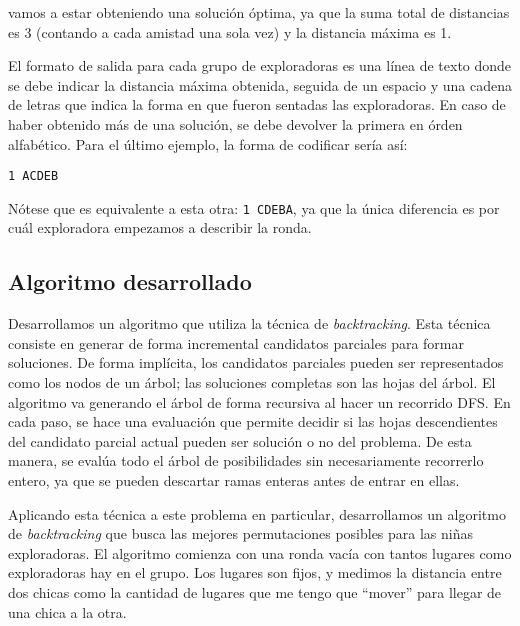 vamos a estar obteniendo una solución óptima, ya que la suma total de distancias es 3 (contando a cada amistad una sola vez) y la distancia máxima es 1.

El formato de salida para cada grupo de exploradoras es una línea de texto donde se debe indicar la distancia máxima obtenida, seguida de un espacio y una cadena de letras que indica la forma en que fueron sentadas las exploradoras. En caso de haber obtenido más de una solución, se debe devolver la primera en órden alfabético. Para el último ejemplo, la forma de codificar sería así:

\texttt{1 ACDEB}

Nótese que es equivalente a esta otra: \texttt{1 CDEBA}, ya que la única diferencia es por cuál exploradora empezamos a describir la ronda.



\subsection{Algoritmo desarrollado}

Desarrollamos un algoritmo que utiliza la técnica de \textit{backtracking}. Esta técnica consiste en generar de forma incremental candidatos parciales para formar soluciones. De forma implícita, los candidatos parciales pueden ser representados como los nodos de un árbol; las soluciones completas son las hojas del árbol. El algoritmo va generando el árbol de forma recursiva al hacer un recorrido DFS. En cada paso, se hace una evaluación que permite decidir si las hojas descendientes del candidato parcial actual pueden ser solución o no del problema. De esta manera, se evalúa todo el árbol de posibilidades sin necesariamente recorrerlo entero, ya que se pueden descartar ramas enteras antes de entrar en ellas.

Aplicando esta técnica a este problema en particular, desarrollamos un algoritmo de \textit{backtracking} que busca las mejores permutaciones posibles para las niñas exploradoras. El algoritmo comienza con una ronda vacía con tantos lugares como exploradoras hay en el grupo. Los lugares son fijos, y medimos la distancia entre dos chicas como la cantidad de lugares que me tengo que ``mover'' para llegar de una chica a la otra.

